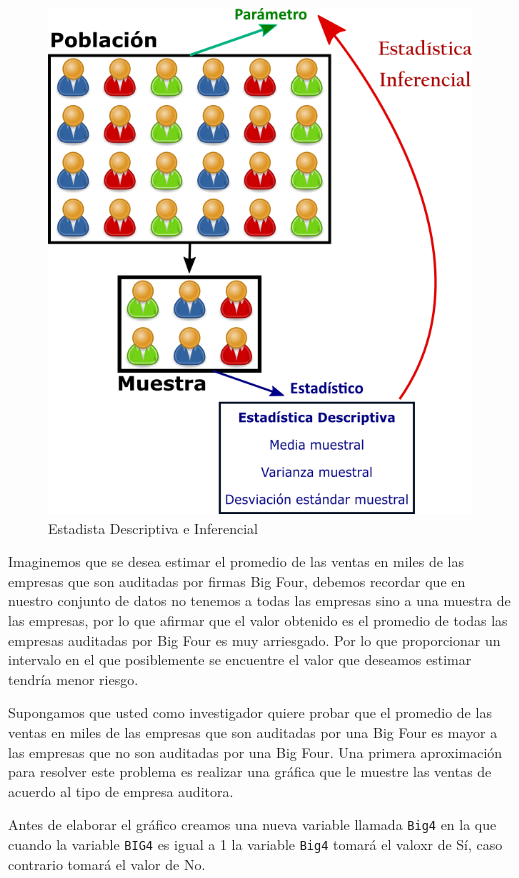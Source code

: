 \documentclass[
]{krantz}
\makeatletter
\newenvironment{Shaded}{\begin{snugshade}}{\end{snugshade}}
\newcommand{\DataTypeTok}[1]{\textcolor[rgb]{0.27,0.27,0.27}{#1}}
\newcommand{\DecValTok}[1]{\textcolor[rgb]{0.06,0.06,0.06}{#1}}
\newcommand{\KeywordTok}[1]{\textcolor[rgb]{0.27,0.27,0.27}{\textbf{#1}}}
\newcommand{\NormalTok}[1]{#1}
\newcommand{\OperatorTok}[1]{\textcolor[rgb]{0.43,0.43,0.43}{\textbf{#1}}}
\newcommand{\StringTok}[1]{\textcolor[rgb]{0.5,0.5,0.5}{#1}}
\newenvironment{kframe}{%
\medskip{}
\setlength{\fboxsep}{.8em}
 \def\at@end@of@kframe{}%
 \ifinner\ifhmode%
  \def\at@end@of@kframe{\end{minipage}}%
  \begin{minipage}{\columnwidth}%
 \fi\fi%
 \def\FrameCommand##1{\hskip\@totalleftmargin \hskip-\fboxsep
 \colorbox{shadecolor}{##1}\hskip-\fboxsep
     \hskip-\linewidth \hskip-\@totalleftmargin \hskip\columnwidth}%
 \MakeFramed {\advance\hsize-\width
   \@totalleftmargin\z@ \linewidth\hsize
   \@setminipage}}%
 {\par\unskip\endMakeFramed%
 \at@end@of@kframe}
\renewenvironment{Shaded}{\begin{kframe}}{\end{kframe}}
\makeatother
\begin{document}
\begin{figure}[h!]

{\centering \includegraphics[width=0.55\linewidth]{infedesc} 

}

\caption{Estadista Descriptiva e Inferencial}\label{fig:infedesc}
\end{figure}

Imaginemos que se desea estimar el promedio de las ventas en miles de las empresas que son auditadas por firmas Big Four, debemos recordar que en nuestro conjunto de datos no tenemos a todas las empresas sino a una muestra de las empresas, por lo que afirmar que el valor obtenido es el promedio de todas las empresas auditadas por Big Four es muy arriesgado. Por lo que proporcionar un intervalo en el que posiblemente se encuentre el valor que deseamos estimar tendría menor riesgo.

Supongamos que usted como investigador quiere probar que el promedio de las ventas en miles de las empresas que son auditadas por una Big Four es mayor a las empresas que no son auditadas por una Big Four. Una primera aproximación para resolver este problema es realizar una gráfica que le muestre las ventas de acuerdo al tipo de empresa auditora.

Antes de elaborar el gráfico creamos una nueva variable llamada \texttt{Big4} en la que cuando la variable \texttt{BIG4} es igual a 1 la variable \texttt{Big4} tomará el valoxr de Sí, caso contrario tomará el valor de No.~

\begin{Shaded}
\end{Shaded}
\end{document}
